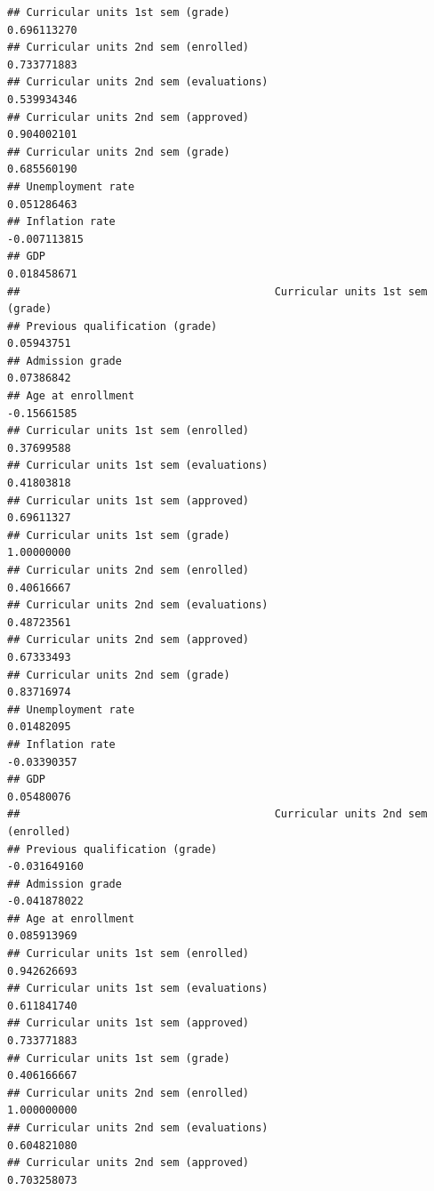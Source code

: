 \documentclass[
]{article}
\begin{document}
\begin{verbatim}
## Curricular units 1st sem (grade)                               0.696113270
## Curricular units 2nd sem (enrolled)                            0.733771883
## Curricular units 2nd sem (evaluations)                         0.539934346
## Curricular units 2nd sem (approved)                            0.904002101
## Curricular units 2nd sem (grade)                               0.685560190
## Unemployment rate                                              0.051286463
## Inflation rate                                                -0.007113815
## GDP                                                            0.018458671
##                                        Curricular units 1st sem (grade)
## Previous qualification (grade)                               0.05943751
## Admission grade                                              0.07386842
## Age at enrollment                                           -0.15661585
## Curricular units 1st sem (enrolled)                          0.37699588
## Curricular units 1st sem (evaluations)                       0.41803818
## Curricular units 1st sem (approved)                          0.69611327
## Curricular units 1st sem (grade)                             1.00000000
## Curricular units 2nd sem (enrolled)                          0.40616667
## Curricular units 2nd sem (evaluations)                       0.48723561
## Curricular units 2nd sem (approved)                          0.67333493
## Curricular units 2nd sem (grade)                             0.83716974
## Unemployment rate                                            0.01482095
## Inflation rate                                              -0.03390357
## GDP                                                          0.05480076
##                                        Curricular units 2nd sem (enrolled)
## Previous qualification (grade)                                -0.031649160
## Admission grade                                               -0.041878022
## Age at enrollment                                              0.085913969
## Curricular units 1st sem (enrolled)                            0.942626693
## Curricular units 1st sem (evaluations)                         0.611841740
## Curricular units 1st sem (approved)                            0.733771883
## Curricular units 1st sem (grade)                               0.406166667
## Curricular units 2nd sem (enrolled)                            1.000000000
## Curricular units 2nd sem (evaluations)                         0.604821080
## Curricular units 2nd sem (approved)                            0.703258073

\end{verbatim}
\end{document}
